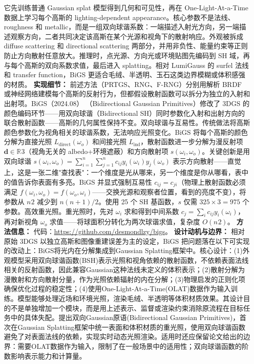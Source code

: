 它先训练普通 Gaussian splat 模型得到几何和可见性，再在 One-Light-At-a-Time 数据上学习每个高斯的 lighting-dependent appearance。核心参数不是法线、roughness 和 metallic，而是一组双向球谐系数：一端描述入射光方向，另一端描述观察方向，二者共同决定该高斯在某个光源和视角下的散射响应。外观被拆成 diffuse scattering 和 directional scattering 两部分，并用非负性、能量约束等正则防止方向散射任意放大。推理时，点光源、方向光或环境贴图先编码到 SH 域，再与每个高斯的双向系数求值，最后进入 splatting。相对 LumiGauss 的 surfel 法线和 transfer function，BiGS 更适合毛绒、半透明、玉石这类边界模糊或体积感强的材质。
\textbf{实现细节：} 前述方法（PRTGS、RNG、F-RNG）分别用解析 BRDF 或神经网络建模每个高斯的反射行为，但都假设散射函数可以拆分为独立的入射和出射项。BiGS（2024.08） （Bidirectional Gaussian Primitives）修改了 3DGS 的颜色编码环节——用双向球谐（Bidirectional SH）同时参数化入射和出射方向的联合散射函数——高斯的几何属性保持不变。双向球谐与互易性。传统做法将高斯颜色参数化为视角相关的球谐系数，无法响应光照变化。BiGS 将每个高斯的颜色分解为直接光照 $L_{\mathrm{direct}}(\omega_o)$ 和间接光照 $L_{\mathrm{ind}}$，散射函数进一步分解为漫反射项 $\mathbf{d} \in \mathbb{R}^{}3$（视角无关的 albedo+环境遮蔽）和方向散射项 $s(\omega_i, \omega_o)$。关键创新是用双向球谐 $s(\omega_i, \omega_o) = \sum_{i=1}^{n} \sum_{j=1}^{n} c_{ij} y_i(\omega_i) y_j(\omega_o)$ 表示方向散射——直觉上，这是一张二维"查找表"：一个维度是光从哪来，另一个维度是你从哪看，表中的值告诉你表面有多亮。BiGS 并显式强制互易性 $c_{ij} = c_{ji}$（物理上散射函数必须满足 $f(\omega_i, \omega_o) = f(\omega_o, \omega_i)$——交换光源和观察者位置，看到的亮度不变），将参数从 $n^{}2$ 减少到 $n(n+1)/2$。使用 25 个 SH 基函数，$s$ 仅需 $325 \times 3 = 975$ 个参数。高效重光照。重光照时，先对 $\omega_i$ 求和得到中间系数 $c_j = \sum_{i} c_{ij} y_i(\omega_i)$，再对新视角 $\omega_o$ 求值——将球面积分转化为两次球谐求值，复杂度 $O(n^{}2)$。
\textbf{方法信息：} 代码：\url{https://github.com/desmondlzy/bigs}。
\textbf{设计动机与边界：} 相对原始 3DGS 以独立高斯和图像重建误差为主的设定，BiGS 把问题落在以下可实现的改动上：BiGS将光内在分解集成到Gaussian Splatting框架中。核心设计：(1)外观模型采用双向球谐函数(BSH)表示光照和视角依赖的散射函数，不依赖表面法线相关的反射函数，因此兼容Gaussian这种法线未定义的体积表示；(2)散射分解为漫散射和方向散射分量，作为光照依赖辐射的内在分解；(3)物理启发的正则化项确保优化过程的稳定性；(4)使用One-Light-At-a-Time(OLAT)数据作为输入训练。模型能够处理近场和环境光照，渲染毛绒、半透明等体积材质效果。其设计目的不是单独增加一个模块，而是用上述表示、监督或渲染约束消除原流程在目标任务中的具体失配。提出双向Gaussian原语(Bidirectional Gaussian Primitives)，首次在Gaussian Splatting框架中统一表面和体积材质的重光照，使用双向球谐函数避免了对表面法线的依赖，实现实时动态光照渲染。适用时还应保留论文给出的边界：需要OLAT数据作为输入，限制了在一般场景中的适用性；双向球谐函数的阶数影响表示能力和计算量。
